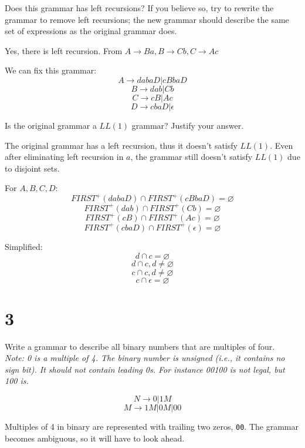 \documentclass[11pt]{article}
\begin{document}
\begin{Parts}
	\Part Does this grammar has left recursions? If you believe so, try to rewrite the grammar to remove left recursions; the new grammar should describe the same set of expressions as the original grammar does.
	\begin{Answer}
		Yes, there is left recursion. From $A \rightarrow Ba, B \rightarrow Cb, C \rightarrow Ac$

		We can fix this grammar:
		$$A \rightarrow dabaD | cBbaD$$
		$$B \rightarrow dab | Cb$$
		$$C \rightarrow cB | Ac$$
		$$D \rightarrow cbaD | \epsilon$$
	\end{Answer}
	\Part Is the original grammar a $LL(1)$ grammar? Justify your answer.
	\begin{Answer}
		The original grammar has a left recursion, thus it doesn't satisfy $LL(1)$. Even after eliminating left recursion in $a$, the grammar still doesn't satisfy $LL(1)$ due to disjoint sets.

		For $A, B, C, D$:
		$$FIRST^+(dabaD) \cap FIRST^+(cBbaD) = \varnothing$$
		$$FIRST^+(dab) \cap FIRST^+(Cb) = \varnothing$$
		$$FIRST^+(cB) \cap FIRST^+(Ac) = \varnothing$$
		$$FIRST^+(cbaD) \cap FIRST^+(\epsilon) = \varnothing$$

		Simplified:
		$$d \cap c = \varnothing$$
		$$d \cap c, d \neq \varnothing$$
		$$c \cap c, d \neq \varnothing$$
		$$c \cap \epsilon = \varnothing$$
	\end{Answer}
\end{Parts}

\newpage

\section*{3}
Write a grammar to describe all binary numbers that are multiples of four. \\

\textit{Note: 0 is a multiple of 4.
	The binary number is unsigned (i.e., it contains no sign bit).
	It should not contain leading 0s. For instance 00100 is not legal, but 100 is.}

\begin{Answer}
	$$N \rightarrow 0 | 1 M$$
	$$M \rightarrow 1M | 0M | 00$$

	Multiples of 4 in binary are represented with trailing two zeros, \verb|00|. The grammar becomes ambiguous, so it will have to look ahead.
\end{Answer}
\newpage
\end{document}
